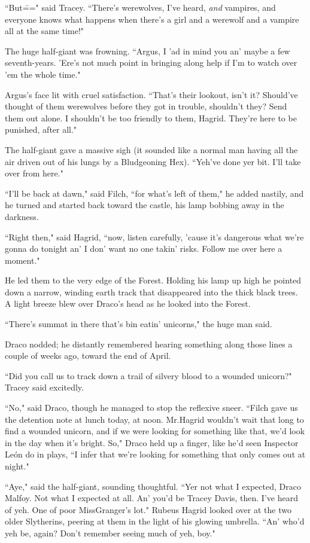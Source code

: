 ``But\===" said Tracey. ``There's werewolves, I've heard, \emph{and} vampires, and everyone knows what happens when there's a girl and a werewolf and a vampire all at the same time!"

The huge half-giant was frowning. ``Argus, I 'ad in mind you an' maybe a few seventh-years. 'Ere's not much point in bringing along help if I'm to watch over 'em the whole time."

Argus's face lit with cruel satisfaction. ``That's their lookout, isn't it? Should've thought of them werewolves before they got in trouble, shouldn't they? Send them out alone. I shouldn't be too friendly to them, Hagrid. They're here to be punished, after all."

The half-giant gave a massive sigh (it sounded like a normal man having all the air driven out of his lungs by a Bludgeoning Hex). ``Yeh've done yer bit. I'll take over from here."

``I'll be back at dawn," said Filch, ``for what's left of them," he added nastily, and he turned and started back toward the castle, his lamp bobbing away in the darkness.

``Right then," said Hagrid, ``now, listen carefully, 'cause it's dangerous what we're gonna do tonight an' I don' want no one takin' risks. Follow me over here a moment."

He led them to the very edge of the Forest. Holding his lamp up high he pointed down a narrow, winding earth track that disappeared into the thick black trees. A light breeze blew over Draco's head as he looked into the Forest.

``There's summat in there that's bin eatin' unicorns," the huge man said.

Draco nodded; he distantly remembered hearing something along those lines a couple of weeks ago, toward the end of April.

``Did you call us to track down a trail of silvery blood to a wounded unicorn?" Tracey said excitedly.

``No," said Draco, though he managed to stop the reflexive sneer. ``Filch gave us the detention note at lunch today, at noon. Mr.\?Hagrid wouldn't wait that long to find a wounded unicorn, and if we were looking for something like that, we'd look in the day when it's bright. So," Draco held up a finger, like he'd seen Inspector León do in plays, ``I infer that we're looking for something that only comes out at night."

``Aye," said the half-giant, sounding thoughtful. ``Yer not what I expected, Draco Malfoy. Not what I expected at all. An' you'd be Tracey Davis, then. I've heard of yeh. One of poor Miss\?Granger's lot." Rubeus Hagrid looked over at the two older Slytherins, peering at them in the light of his glowing umbrella. ``An' who'd yeh be, again? Don't remember seeing much of yeh, boy."

